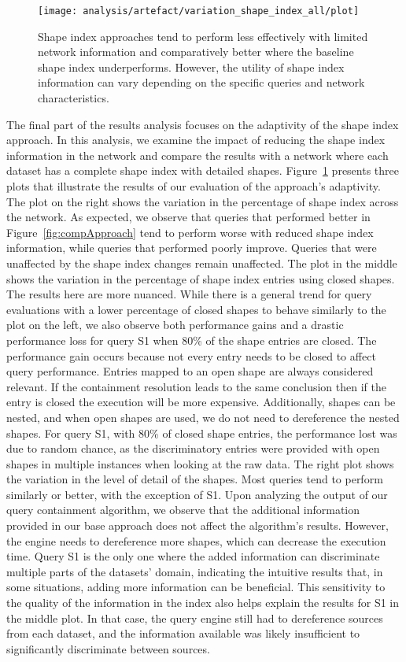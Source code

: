 \begin{figure}[h]
    \centering
    \texttt{[image: analysis/artefact/variation\_shape\_index\_all/plot]}
    \caption{
    Shape index approaches tend to perform less effectively with limited network information and comparatively better where the baseline shape index underperforms.
    However, the utility of shape index information can vary depending on the specific queries and network characteristics.
    }
    \label{fig:adaptShapeIndex}
\end{figure}

The final part of the results analysis focuses on the adaptivity of the shape index approach.
In this analysis, we examine the impact of reducing the shape index information in the network and compare the results with a network where each dataset has a complete shape index with detailed shapes.
Figure~\ref{fig:adaptShapeIndex} presents three plots that illustrate the results of our evaluation of the approach's adaptivity.
The plot on the right shows the variation in the percentage of shape index across the network. 
As expected, we observe that queries that performed better in Figure~\ref{fig:compApproach} tend to perform worse with reduced shape index information, while queries that performed poorly improve. 
Queries that were unaffected by the shape index changes remain unaffected.
The plot in the middle shows the variation in the percentage of shape index entries using closed shapes.
The results here are more nuanced.
While there is a general trend for query evaluations with a lower percentage of closed shapes to behave similarly to the plot on the left, we also observe both performance gains and a drastic performance loss for query S1 when 80\% of the shape entries are closed.
The performance gain occurs because not every entry needs to be closed to affect query performance.
Entries mapped to an open shape are always considered relevant.
If the containment resolution leads to the same conclusion then if the entry is closed the execution will be more expensive. 
Additionally, shapes can be nested, and when open shapes are used, we do not need to dereference the nested shapes.
For query S1, with 80\% of closed shape entries, the performance lost was due to random chance, as the discriminatory entries were provided with open shapes in multiple instances when looking at the raw data.
The right plot shows the variation in the level of detail of the shapes.
Most queries tend to perform similarly or better, with the exception of S1.
Upon analyzing the output of our query containment algorithm, we observe that the additional information provided in our base approach does not affect the algorithm’s results.
However, the engine needs to dereference more shapes, which can decrease the execution time.
Query S1 is the only one where the added information can discriminate multiple parts of the datasets' domain, indicating the intuitive results that, in some situations, adding more information can be beneficial.
This sensitivity to the quality of the information in the index also helps explain the results for S1 in the middle plot. 
In that case, the query engine still had to dereference sources from each dataset, and the information available was likely insufficient to significantly discriminate between sources.


